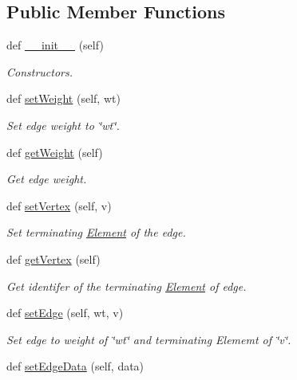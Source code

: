 \subsection*{Public Member Functions}
\begin{DoxyCompactItemize}
\item 
def \hyperlink{class_edge_1_1_edge_a34341733ffb907488ec5b7498f668cb0}{\+\_\+\+\_\+init\+\_\+\+\_\+} (self)
\begin{DoxyCompactList}\small\item\em Constructors. \end{DoxyCompactList}\item 
def \hyperlink{class_edge_1_1_edge_a4989022829dad911692cbfa1a32809b0}{set\+Weight} (self, wt)
\begin{DoxyCompactList}\small\item\em Set edge weight to \char`\"{}wt\char`\"{}. \end{DoxyCompactList}\item 
def \hyperlink{class_edge_1_1_edge_ab0a0b2adc8d1662581d56557a3fc0df3}{get\+Weight} (self)
\begin{DoxyCompactList}\small\item\em Get edge weight. \end{DoxyCompactList}\item 
def \hyperlink{class_edge_1_1_edge_acc0e90e6ab08122159f5130768e8cb6b}{set\+Vertex} (self, v)
\begin{DoxyCompactList}\small\item\em Set terminating \hyperlink{namespace_element}{Element} of the edge. \end{DoxyCompactList}\item 
def \hyperlink{class_edge_1_1_edge_ab5783c6a39d90dbd42653a9d07682929}{get\+Vertex} (self)
\begin{DoxyCompactList}\small\item\em Get identifer of the terminating \hyperlink{namespace_element}{Element} of edge. \end{DoxyCompactList}\item 
def \hyperlink{class_edge_1_1_edge_afe129e75ba6c6cb076ec6780e06e31be}{set\+Edge} (self, wt, v)
\begin{DoxyCompactList}\small\item\em Set edge to weight of \char`\"{}wt\char`\"{} and terminating Elememt of \char`\"{}v\char`\"{}. \end{DoxyCompactList}\item 
def \hyperlink{class_edge_1_1_edge_a07ec26da674c890cd63bc384a309f57a}{set\+Edge\+Data} (self, data)

\end{DoxyCompactItemize}
